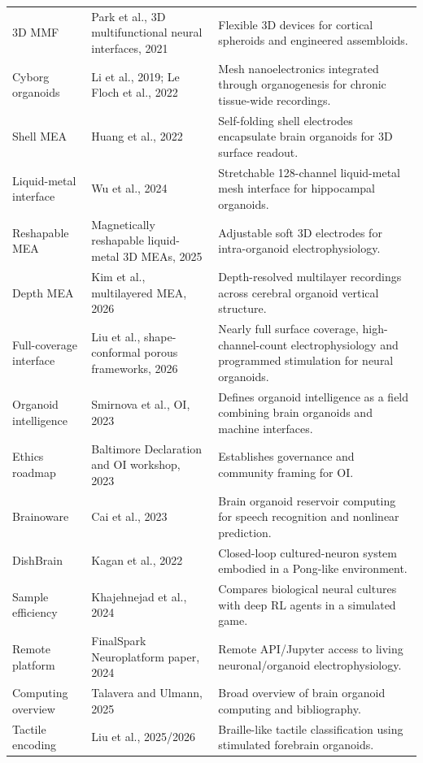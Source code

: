\documentclass[10pt,twocolumn]{article}
\begin{document}
\begin{table}[t]
\begin{tabularx}{\textwidth}{p{}p{}X}
3D MMF & Park et al., 3D multifunctional neural interfaces, 2021 \cite{park2021} & Flexible 3D devices for cortical spheroids and engineered assembloids. \\
Cyborg organoids & Li et al., 2019; Le Floch et al., 2022 \cite{li2019,lefloch2022} & Mesh nanoelectronics integrated through organogenesis for chronic tissue-wide recordings. \\
Shell MEA & Huang et al., 2022 \cite{huang2022} & Self-folding shell electrodes encapsulate brain organoids for 3D surface readout. \\
Liquid-metal interface & Wu et al., 2024 \cite{wu2024} & Stretchable 128-channel liquid-metal mesh interface for hippocampal organoids. \\
Reshapable MEA & Magnetically reshapable liquid-metal 3D MEAs, 2025 \cite{magnetic2025} & Adjustable soft 3D electrodes for intra-organoid electrophysiology. \\
Depth MEA & Kim et al., multilayered MEA, 2026 \cite{kim2026} & Depth-resolved multilayer recordings across cerebral organoid vertical structure. \\
Full-coverage interface & Liu et al., shape-conformal porous frameworks, 2026 \cite{shapeconformal2026} & Nearly full surface coverage, high-channel-count electrophysiology and programmed stimulation for neural organoids. \\
\midrule
Organoid intelligence & Smirnova et al., OI, 2023 \cite{smirnova2023} & Defines organoid intelligence as a field combining brain organoids and machine interfaces. \\
Ethics roadmap & Baltimore Declaration and OI workshop, 2023 \cite{baltimore2023,workshop2023} & Establishes governance and community framing for OI. \\
Brainoware & Cai et al., 2023 \cite{cai2023} & Brain organoid reservoir computing for speech recognition and nonlinear prediction. \\
DishBrain & Kagan et al., 2022 \cite{kagan2022} & Closed-loop cultured-neuron system embodied in a Pong-like environment. \\
Sample efficiency & Khajehnejad et al., 2024 \cite{khajehnejad2024} & Compares biological neural cultures with deep RL agents in a simulated game. \\
Remote platform & FinalSpark Neuroplatform paper, 2024 \cite{finalspark2024} & Remote API/Jupyter access to living neuronal/organoid electrophysiology. \\
Computing overview & Talavera and Ulmann, 2025 \cite{talavera2025} & Broad overview of brain organoid computing and bibliography. \\
Tactile encoding & Liu et al., 2025/2026 \cite{liu2025} & Braille-like tactile classification using stimulated forebrain organoids. \\
\bottomrule
\end{tabularx}
\end{table}
\end{document}
